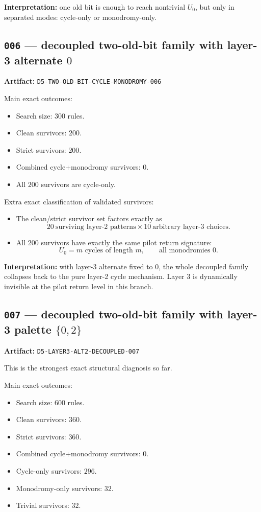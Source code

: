 \documentclass[11pt]{article}
\begin{document}
\textbf{Interpretation:} one old bit is enough to reach nontrivial $U_0$, but only in separated modes: cycle-only or monodromy-only.

\subsection*{\texttt{006} --- decoupled two-old-bit family with layer-3 alternate $0$}

\textbf{Artifact:} \texttt{D5-TWO-OLD-BIT-CYCLE-MONODROMY-006}

Main exact outcomes:
\begin{itemize}
    \item Search size: $300$ rules.
    \item Clean survivors: $200$.
    \item Strict survivors: $200$.
    \item Combined cycle+monodromy survivors: $0$.
    \item All $200$ survivors are cycle-only.
\end{itemize}

Extra exact classification of validated survivors:
\begin{itemize}
    \item The clean/strict survivor set factors exactly as
    \[
    20\ \text{surviving layer-2 patterns} \times 10\ \text{arbitrary layer-3 choices}.
    \]
    \item All $200$ survivors have exactly the same pilot return signature:
    \[
    U_0 = m \text{ cycles of length } m,
    \qquad \text{all monodromies } 0.
    \]
\end{itemize}

\textbf{Interpretation:} with layer-3 alternate fixed to $0$, the whole decoupled family collapses back to the pure layer-2 cycle mechanism. Layer 3 is dynamically invisible at the pilot return level in this branch.

\subsection*{\texttt{007} --- decoupled two-old-bit family with layer-3 palette $\{0,2\}$}

\textbf{Artifact:} \texttt{D5-LAYER3-ALT2-DECOUPLED-007}

This is the strongest exact structural diagnosis so far.

Main exact outcomes:
\begin{itemize}
    \item Search size: $600$ rules.
    \item Clean survivors: $360$.
    \item Strict survivors: $360$.
    \item Combined cycle+monodromy survivors: $0$.
    \item Cycle-only survivors: $296$.
    \item Monodromy-only survivors: $32$.
    \item Trivial survivors: $32$.
\end{itemize}
\end{document}
